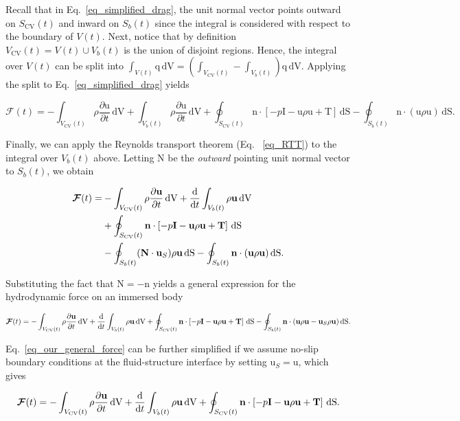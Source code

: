 \documentclass[review]{elsarticle}
\renewcommand \d [2]{\frac{{\rm d} #1}{{\rm d} #2}}
\newcommand \D [2]{\frac{\partial #1}{\partial #2}}
\renewcommand{\vec}[1]{\bm{\mathrm{#1}}}
\def \q{\vec{q}}
\def \n{\vec{n}}
\def \u{\vec{u}}
\def \uS{\vec{u}_S}
\def \I{\vec{I}}
\def \N{\vec{N}}
\def \T{\vec{T}}
\def \Sbt{S_b(t)}
\def  \Scvt{S_\text{CV}(t)}
\def \Vt{V(t)}
\def \Vbt{V_b(t)}
\def  \Vcvt{V_\text{CV}(t)}
\def \cF{\vec{\mathcal{F}}}
\def \I{\vec{I}}
\def \N{\vec{N}}
\def \n{\vec{n}}
\def \u{\vec{u}}
\def \dS{\,\mathrm{dS}}
\def \dV{\,\mathrm{dV}}
\def \ndot{\n \cdot}
\def \Ndot{\N \cdot}
\begin{document}
\noindent Recall that in Eq.~\eqref{eq_simplified_drag}, the unit normal vector
points outward on $\Scvt$ and inward on $\Sbt$ since the integral is considered with
respect to the boundary of $\Vt$. Next, notice that by definition
$\Vcvt = \Vt \cup \Vbt$ is the union of disjoint regions. Hence, the integral over
$\Vt$ can be split into $\int_{\Vt} \q \dV = \left(\int_{\Vcvt} - \int_{\Vbt}\right) \q \dV$.
Applying the split to Eq.~\eqref{eq_simplified_drag} yields

\begin{equation}
\cF(t) =  
 -\int_{\Vcvt} \rho \D{\u}{t} \dV 
 + \int_{\Vbt} \rho \D{\u}{t} \dV
 + \oint_{\Scvt} \ndot \left[-p \I - \u \rho \u + \T \right] \dS 
 - \oint_{\Sbt} \ndot (\u \rho \u) \dS.
\end{equation}

\noindent Finally, we can apply the Reynolds transport theorem (Eq.
~\eqref{eq_RTT}) to the integral over $\Vbt$ above. Letting $\N$ be the
\emph{outward} pointing unit normal vector to $\Sbt$, we obtain

\begin{align}
\cF(t) = 
 &-\int_{\Vcvt} \rho \D{\u}{t} \dV  \nonumber
 + \d{}{t} \int_{\Vbt} \rho \u \dV \\
 &+ \oint_{\Scvt} \ndot \left[-p \I - \u \rho \u + \T \right] \dS \\
 &  - \oint_{\Sbt} (\Ndot \uS) \rho \u \dS 
 - \oint_{\Sbt} \ndot (\u \rho \u) \dS. \nonumber
\end{align}

\noindent Substituting the fact that $\N = -\n$ yields a general expression
for the hydrodynamic force on an immersed body

\begin{equation}
\label{eq_our_general_force}
\cF(t) = 
 -\int_{\Vcvt} \rho \D{\u}{t} \dV  
 + \d{}{t} \int_{\Vbt} \rho \u \dV 
 + \oint_{\Scvt} \ndot \left[-p \I - \u \rho \u + \T \right] \dS 
 - \oint_{\Sbt} \ndot (\u \rho \u - \uS \rho \u) \dS.
\end{equation}

\noindent Eq.~\eqref{eq_our_general_force} can be further simplified if we assume
no-slip boundary conditions at the fluid-structure interface by setting $\uS = \u$, which gives
 
\begin{equation}
\cF(t) = 
-\int_{\Vcvt} \rho \D{\u}{t} \dV
+ \d{}{t} \int_{\Vbt} \rho \u \dV 
+ \oint_{\Scvt} \ndot \left[-p \I - \u\rho \u + \T \right] \dS.
\end{equation}
\end{document}
